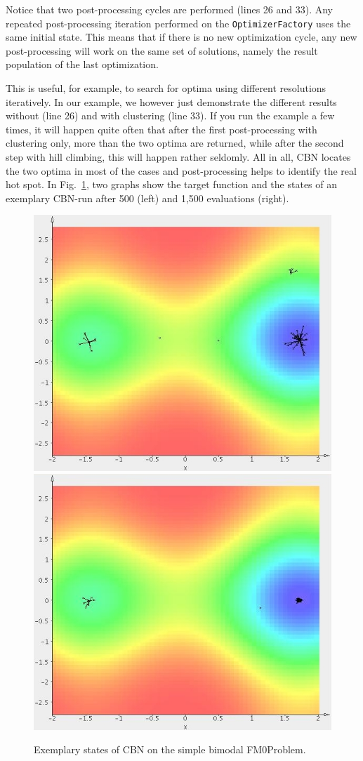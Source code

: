 Notice that two post-processing cycles are performed (lines 26 and
33). Any repeated post-processing iteration performed on the \texttt{OptimizerFactory}
uses the same initial state. This means that if there is no new optimization
cycle, any new post-processing will work on the same set of solutions,
namely the result population of the last optimization.

This is useful, for example, to search for optima using different
resolutions iteratively. In our example, we however just demonstrate
the different results without (line 26) and with clustering (line
33). If you run the example a few times, it will happen quite often
that after the first post-processing with clustering only, more than
the two optima are returned, while after the second step with hill
climbing, this will happen rather seldomly. All in all, CBN locates
the two optima in most of the cases and post-processing helps to identify
the real hot spot. In Fig.~\ref{fig:Exemplary-states-of-CBN}, two
graphs show the target function and the states of an exemplary CBN-run
after 500 (left) and 1,500 evaluations (right).

\begin{figure}
\includegraphics[width=0.49\columnwidth]{pics/fm0-cbn-500}\includegraphics[width=0.49\columnwidth]{pics/fm0-cbn-1500}

\caption{Exemplary states of CBN on the simple bimodal FM0Problem.\label{fig:Exemplary-states-of-CBN}}
\end{figure}


